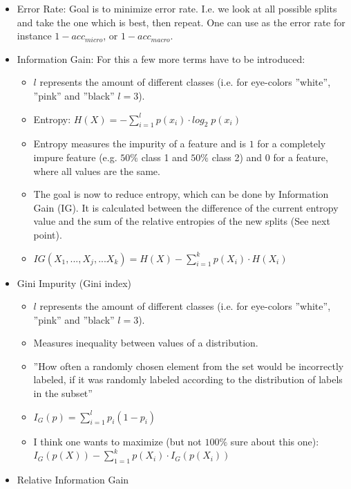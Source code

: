 \documentclass[12pt,a4paper]{article}
\begin{document}
\begin{itemize}
    \item Error Rate: Goal is to minimize error rate. I.e. we look at all possible splits and take the one which is best, then repeat. One can use as the error rate for instance \(1 - acc_{micro}\), or \(1 - acc_{macro}\).
    \item Information Gain: For this a few more terms have to be introduced:
        \begin{itemize}
            \item \(l\) represents the amount of different classes (i.e. for eye-colors ''white'', ''pink'' and ''black'' \(l = 3\)).
            \item Entropy: \(H(X) = - \sum_{i = 1}^l p(x_i) \cdot log_2 \; p(x_i)\)
            \item Entropy measures the impurity of a feature and is \(1\) for a completely impure feature (e.g. \(50\%\) class 1 and \(50\%\) class 2) and \(0\) for a feature, where all values are the same.
            \item The goal is now to reduce entropy, which can be done by Information Gain (IG). It is calculated between the difference of the current entropy value and the sum of the relative entropies of the new splits (See next point).
            \item \(IG(X_1,...,X_j,...X_k) = H(X) - \sum_{i = 1}^k p(X_i) \cdot H(X_i)\)
        \end{itemize}
    \item Gini Impurity (Gini index)
        \begin{itemize}
            \item \(l\) represents the amount of different classes (i.e. for eye-colors ''white'', ''pink'' and ''black'' \(l = 3\)).
            \item Measures inequality between values of a distribution.
            \item ''How often a randomly chosen element from the set would be incorrectly labeled, if it was randomly labeled according to the distribution of labels in the subset''
            \item \(I_G(p) = \sum_{i = 1}^l p_i (1 - p_i)\)
            \item I think one wants to maximize (but not \(100\%\) sure about this one): \(I_G(p(X)) - \sum_{1 = 1}^k p(X_i) \cdot I_G(p(X_i))\)
        \end{itemize}
    \item Relative Information Gain
        \begin{itemize}

\end{itemize}
\end{itemize}
\end{document}
